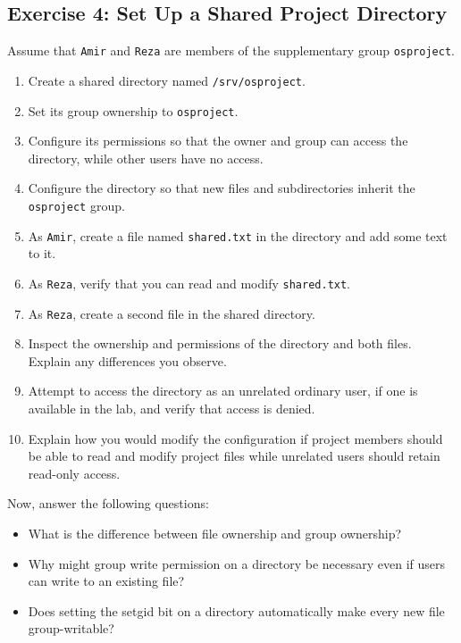 \subsection{Exercise 4: Set Up a Shared Project Directory}
Assume that \texttt{Amir} and \texttt{Reza} are members of the supplementary group \texttt{osproject}. \begin{enumerate}
	\item Create a shared directory named \texttt{/srv/osproject}.
	\item Set its group ownership to \texttt{osproject}.
	\item Configure its permissions so that the owner and group can access the directory, while other users have no access.
	\item Configure the directory so that new files and subdirectories inherit the \texttt{osproject} group.
	\item As \texttt{Amir}, create a file named \texttt{shared.txt} in the directory and add some text to it.
	\item As \texttt{Reza}, verify that you can read and modify \texttt{shared.txt}.
	\item As \texttt{Reza}, create a second file in the shared directory.
	\item Inspect the ownership and permissions of the directory and both files. Explain any differences you observe.
	\item Attempt to access the directory as an unrelated ordinary user, if one is available in the lab, and verify that access is denied.
	\item Explain how you would modify the configuration if project members should be able to read and modify project files while unrelated users should retain read-only access.
\end{enumerate}
Now, answer the following questions:
\begin{itemize}
	\item What is the difference between file ownership and group ownership?
	\item Why might group write permission on a directory be necessary even if users can write to an existing file?
	\item Does setting the setgid bit on a directory automatically make every new file group-writable?
\end{itemize}